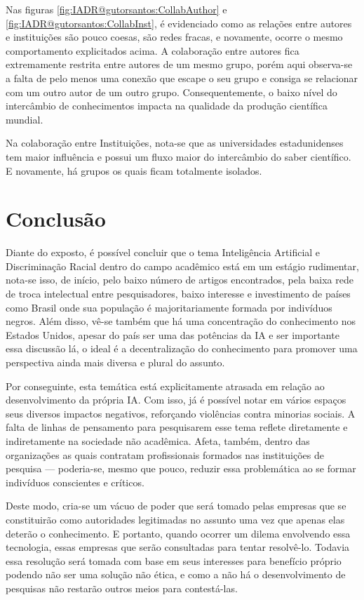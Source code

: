 Nas figuras \ref{fig:IADR@gutorsantos:CollabAuthor} e \ref{fig:IADR@gutorsantos:CollabInst}, é evidenciado como as relações entre autores e instituições são pouco coesas, são redes fracas, e novamente, ocorre o mesmo comportamento explicitados acima. A colaboração entre autores fica extremamente restrita entre autores de um mesmo grupo, porém aqui observa-se a falta de pelo menos uma conexão que escape o seu grupo e consiga se relacionar com um outro autor de um outro grupo. Consequentemente, o baixo nível do intercâmbio de conhecimentos impacta na qualidade da produção científica mundial. 


Na colaboração entre Instituições, nota-se que as universidades estadunidenses tem maior influência e possui um fluxo maior do intercâmbio do saber científico. E novamente, há grupos os quais ficam totalmente isolados. 

\section{Conclusão}

Diante do exposto, é possível concluir que o tema Inteligência Artificial e Discriminação Racial dentro do campo acadêmico está em um estágio rudimentar, nota-se isso, de início, pelo baixo número de artigos encontrados, pela baixa rede de troca intelectual entre pesquisadores, baixo interesse e investimento de países como Brasil onde sua população é majoritariamente formada por indivíduos negros. Além disso, vê-se também que há uma concentração do conhecimento nos Estados Unidos, apesar do país ser uma das potências da IA e ser importante essa discussão lá, o ideal é a decentralização do conhecimento para promover uma perspectiva ainda mais diversa e plural do assunto. 


Por conseguinte, esta temática está explicitamente atrasada em relação ao desenvolvimento da própria IA. Com isso, já é possível notar em vários espaços seus diversos impactos negativos, reforçando violências contra minorias sociais. A falta de linhas de pensamento para pesquisarem esse tema reflete diretamente e indiretamente na sociedade não acadêmica. Afeta, também, dentro das organizações as quais contratam profissionais formados nas instituições de pesquisa --- poderia-se, mesmo que pouco, reduzir essa problemática ao se formar indivíduos conscientes e críticos. 

Deste modo, cria-se um vácuo de poder que será tomado pelas empresas que se constituirão como autoridades legitimadas no assunto uma vez que apenas elas deterão o conhecimento. E portanto, quando ocorrer um dilema envolvendo essa tecnologia, essas empresas que serão consultadas para tentar resolvê-lo. Todavia essa resolução será tomada com base em seus interesses para benefício próprio podendo não ser uma solução não ética, e como a não há o desenvolvimento de pesquisas não restarão outros meios para contestá-las.